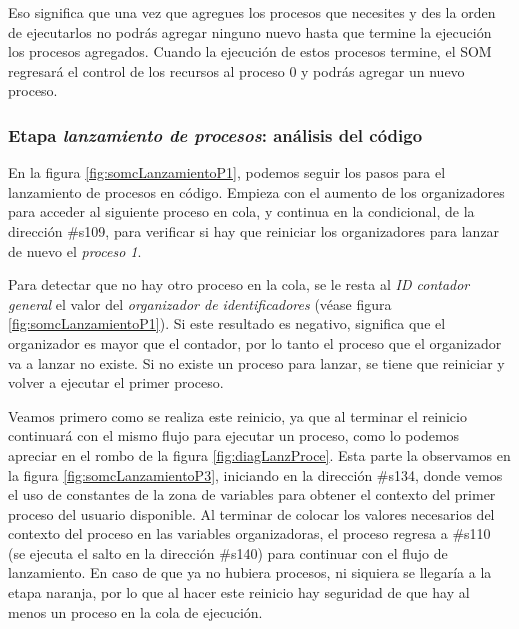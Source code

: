 \documentclass[letterpaper,12pt,oneside]{book}
\begin{document}
		Eso significa que una vez que agregues los procesos
		que necesites y des la orden de ejecutarlos no podrás agregar ninguno nuevo hasta que termine la ejecución los procesos
		agregados. Cuando la ejecución de estos procesos termine, el SOM regresará el control de los recursos al proceso 0 y podrás agregar un nuevo
		proceso.

  		\subsubsection{Etapa \textit{lanzamiento de procesos}: análisis del código }
		
		En la figura \ref{fig:somcLanzamientoP1}, podemos seguir  los pasos para el lanzamiento de procesos en código.
        Empieza con el aumento de los organizadores para acceder al siguiente proceso en cola,
        y continua en la condicional, de la dirección \#s109, para verificar si hay que
		reiniciar los organizadores para lanzar de nuevo el \textit{proceso 1}. 
		
		Para detectar que no hay otro proceso  en la cola, se le resta al \textit{ID contador general} el valor del \textit{organizador de 
        identificadores} (véase figura \ref{fig:somcLanzamientoP1}). Si este 
        resultado
        es negativo, significa que el organizador es  mayor que el contador, por lo tanto el proceso que el organizador va a lanzar no existe. Si no existe un 
        proceso 
        para lanzar,
        se tiene que reiniciar y volver a ejecutar el primer proceso. 

		Veamos primero como se realiza este reinicio, ya que al terminar el reinicio continuará con el mismo flujo
		para ejecutar un proceso, como lo podemos apreciar en el rombo de la figura \ref{fig:diagLanzProce}. Esta parte la observamos en la figura
		\ref{fig:somcLanzamientoP3}, iniciando en la
		dirección \#s134, donde vemos el uso de constantes de la zona de variables para obtener el contexto del primer proceso del usuario disponible. Al 
		terminar de colocar los valores necesarios del contexto del proceso en las variables organizadoras, el proceso
		regresa a \#s110 (se ejecuta el salto en la dirección \#s140) para continuar con el flujo de lanzamiento. En caso de que ya no hubiera procesos, ni 
		siquiera se llegaría a la etapa naranja,
        por lo que al hacer este reinicio hay seguridad de que hay al menos un proceso en la cola de ejecución.
		
		
\end{document}

